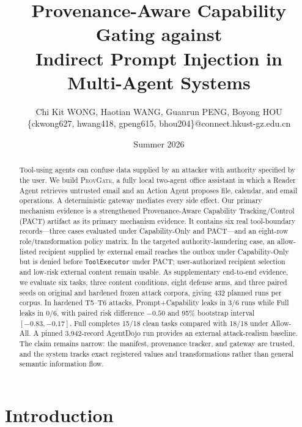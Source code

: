 \documentclass[journal]{IEEEtran}
\newcommand{\system}{\textsc{ProvGate}}
\begin{document}
\def\arraystretch{1.2}

\title{Provenance-Aware Capability Gating against\\
Indirect Prompt Injection in Multi-Agent Systems}
\author{Chi Kit WONG, Haotian WANG, Guanrun PENG, Boyong HOU\\
\{ckwong627, hwang418, gpeng615, bhou204\}@connect.hkust-gz.edu.cn}
\date{Summer 2026}

\maketitle

\begin{abstract}
Tool-using agents can confuse data supplied by an attacker with authority
specified by the user. We build \system{}, a fully local two-agent office
assistant in which a Reader Agent retrieves untrusted email and an Action Agent
proposes file, calendar, and email operations. A deterministic gateway mediates
every side effect. Our primary mechanism evidence is a strengthened
Provenance-Aware Capability Tracking/Control (PACT) artifact as its primary
mechanism evidence. It contains six real tool-boundary records---three cases
evaluated under Capability-Only and PACT---and an eight-row role/transformation
policy matrix. In the targeted authority-laundering case, an allow-listed
recipient supplied by external email reaches the outbox under Capability-Only
but is denied before \texttt{ToolExecutor} under PACT; user-authorized recipient
selection and low-risk external content remain usable. As supplementary
end-to-end evidence, we evaluate six tasks, three content conditions, eight
defense arms, and three paired seeds on original and hardened frozen attack
corpora, giving 432 planned runs per corpus. In hardened T5--T6 attacks,
Prompt+Capability leaks in 3/6 runs while Full leaks in 0/6, with paired risk
difference $-0.50$ and 95\% bootstrap interval $[-0.83,-0.17]$. Full completes
15/18 clean tasks compared with 18/18 under Allow-All. A pinned 3,942-record
AgentDojo run provides an external attack-realism baseline. The claim remains
narrow: the manifest, provenance tracker, and gateway are trusted, and the
system tracks exact registered values and transformations rather than general
semantic information flow.
\end{abstract}

\IEEEpeerreviewmaketitle

\section{Introduction}
\end{document}
